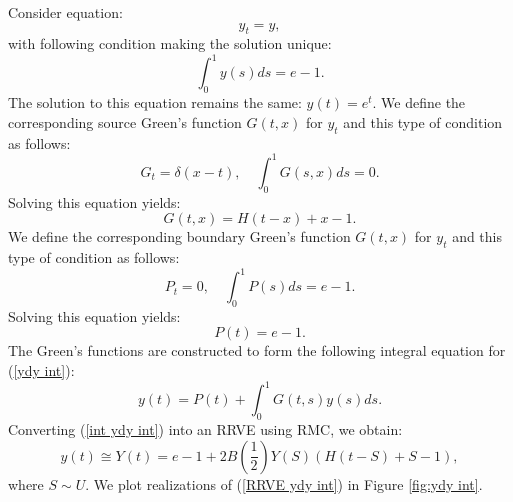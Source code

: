 \documentclass[a4paper,12pt]{article}
\begin{document}
\begin{example}[$y_t=y$ average condition]
  Consider equation:
  \begin{equation} \label{ydy int}
    y_t = y,
  \end{equation}
  with following condition making the solution unique:
  \begin{equation}
    \int_{0}^{1} y(s) ds = e-1.
  \end{equation}
  The solution to this equation remains the same: $y(t) = e^{t}$.
  We define the corresponding source Green's function $G(t,x)$ for $y_t$
  and this type of condition as follows:
  \begin{equation}
    G_t = \delta(x-t), \quad \int_{0}^{1} G(s,x) ds = 0.
  \end{equation}
  Solving this equation yields:
  \begin{equation}
    G(t,x) = H(t-x) + x - 1.
  \end{equation}
  We define the corresponding boundary Green's function $G(t,x)$ for $y_t$
  and this type of condition as follows:
  \begin{equation}
    P_{t} = 0, \quad \int_{0}^{1} P(s) ds = e -1.
  \end{equation}
  Solving this equation yields:
  \begin{equation}
    P(t) = e -1.
  \end{equation}
  The Green's functions are constructed
  to form the following integral equation
  for (\ref{ydy int}):
  \begin{equation} \label{int ydy int}
    y(t) = P(t) + \int_{0}^{1} G(t,s) y(s) ds.
  \end{equation}
  Converting (\ref{int ydy int}) into an RRVE
  using RMC, we obtain:
  \begin{equation}\label{RRVE ydy int}
    y(t) \cong Y(t) = e - 1 + 2B\left(\frac{1}{2}\right)Y(S)(H(t-S)+S-1),
  \end{equation}
  where $S \sim U$. We plot realizations of
  (\ref{RRVE ydy int}) in Figure \ref{fig:ydy int}.


\end{example}
\end{document}
